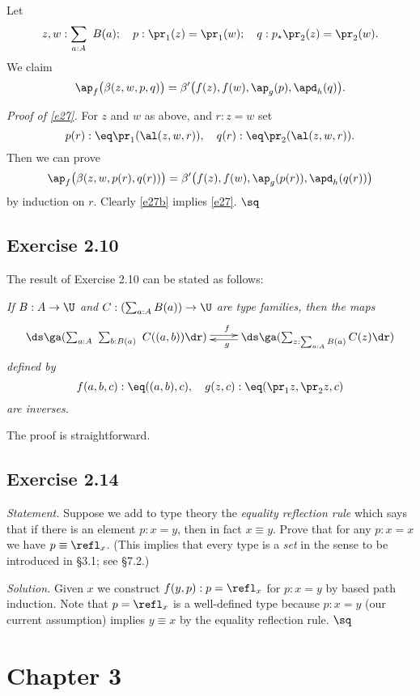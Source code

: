 \documentclass[12pt]{article}
\begin{document}
Let 
$$
z,w:\sum_{a:A}\ B(a);\quad p:\pr_1(z)=\pr_1(w);\quad q:p_\star \pr_2(z)=\pr_2(w).
$$ 
We claim 
\begin{equation}\label{e27}
\ap_f\big(\beta(z,w,p,q)\big)=\beta'\big(f(z),f(w),\ap_g(p),\apd_h(q)\big).
\end{equation}

\nn\emph{Proof of \eqref{e27}.} For $z$ and $w$ as above, and $r:z=w$ set 
$$
p(r):\eq\pr_1(\al(z,w,r)),\quad q(r):\eq\pr_2(\al(z,w,r)).
$$ 
Then we can prove 
\begin{equation}\label{e27b}
\ap_f\big(\beta(z,w,p(r),q(r))\big)=\beta'\big(f(z),f(w),\ap_g(p(r)),\apd_h(q(r))\big)
\end{equation}
by induction on $r$. Clearly \eqref{e27b} implies \eqref{e27}. $\sq$


\subsection{Exercise 2.10}\label{210}

The result of Exercise 2.10 can be stated as follows:

\emph{If $B:A\to\U$ and $C:(\sum_{a:A}B(a))\to\U$ are type families, then the maps
$$
\xymatrix{
\ds\ga(\sum_{a:A}\ \sum_{b:B(a)}\ C((a,b))\dr)\ar@<2pt>[r]^(.55)f&\ds\ga(\sum_{z:\sum_{a:A}B(a)}C(z)\dr)\ar@<2pt>[l]^(.45)g}
$$ 
defined by 
$$
f(a,b,c):\eq((a,b),c),\quad g(z,c):\eq(\pr_1 z,\pr_2z,c)
$$ 
are inverses.}

The proof is straightforward.


\subsection{Exercise 2.14}

\emph{Statement.} Suppose we add to type theory the \emph{equality reflection rule} which says that if there is an element $p:x=y$, then in fact $x\equiv y$. Prove that for any $p:x=x$ we have $p\equiv\refl_x$. (This implies that every type is a \emph{set} in the sense to be introduced in \S3.1; see \S7.2.)

\nn\emph{Solution.} Given $x$ we construct $f(y,p):p=\refl_x$ for $p:x=y$ by based path induction. Note that $p=\refl_x$ is a well-defined type because $p:x=y$ (our current assumption) implies $y\equiv x$ by the equality reflection rule. $\sq$


\section{Chapter 3}
\end{document}
